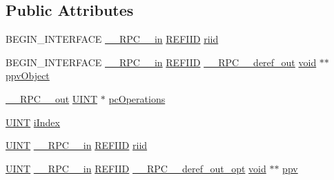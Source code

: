 \subsection*{Public Attributes}
\begin{DoxyCompactItemize}
\item 
B\+E\+G\+I\+N\+\_\+\+I\+N\+T\+E\+R\+F\+A\+CE \hyperlink{rpcsal_8h_a20b7f6da600a05c8b541659f14f7f0e6}{\+\_\+\+\_\+\+R\+P\+C\+\_\+\+\_\+in} \hyperlink{px__win__ds_8c_a80ec49c8ae61e234197d5071d2df497d}{R\+E\+F\+I\+ID} \hyperlink{struct_i_property_change_array_vtbl_afcb4782fa8fc212fa033864bbd143092}{riid}
\item 
B\+E\+G\+I\+N\+\_\+\+I\+N\+T\+E\+R\+F\+A\+CE \hyperlink{rpcsal_8h_a20b7f6da600a05c8b541659f14f7f0e6}{\+\_\+\+\_\+\+R\+P\+C\+\_\+\+\_\+in} \hyperlink{px__win__ds_8c_a80ec49c8ae61e234197d5071d2df497d}{R\+E\+F\+I\+ID} \hyperlink{rpcsal_8h_a23bc188526f10656f9c79d950f6c3192}{\+\_\+\+\_\+\+R\+P\+C\+\_\+\+\_\+deref\+\_\+out} \hyperlink{sound_8c_ae35f5844602719cf66324f4de2a658b3}{void} $\ast$$\ast$ \hyperlink{struct_i_property_change_array_vtbl_a1532e7faf97734c90901bc59cd67f1ba}{ppv\+Object}
\item 
\hyperlink{rpcsal_8h_aa518a2c78d44d75f3685c32c455c5ed8}{\+\_\+\+\_\+\+R\+P\+C\+\_\+\+\_\+out} \hyperlink{mapinls_8h_a36cb3b01d81ffd844bbbfb54003e06ec}{U\+I\+NT} $\ast$ \hyperlink{struct_i_property_change_array_vtbl_abbe22467b2210a2b8b747c8cc7dc6fed}{pc\+Operations}
\item 
\hyperlink{mapinls_8h_a36cb3b01d81ffd844bbbfb54003e06ec}{U\+I\+NT} \hyperlink{struct_i_property_change_array_vtbl_acfa70036730f768fc344b69b3cd64ad0}{i\+Index}
\item 
\hyperlink{mapinls_8h_a36cb3b01d81ffd844bbbfb54003e06ec}{U\+I\+NT} \hyperlink{rpcsal_8h_a20b7f6da600a05c8b541659f14f7f0e6}{\+\_\+\+\_\+\+R\+P\+C\+\_\+\+\_\+in} \hyperlink{px__win__ds_8c_a80ec49c8ae61e234197d5071d2df497d}{R\+E\+F\+I\+ID} \hyperlink{struct_i_property_change_array_vtbl_a62c9c1b7d42896500a8c050752e8c1a5}{riid}
\item 
\hyperlink{mapinls_8h_a36cb3b01d81ffd844bbbfb54003e06ec}{U\+I\+NT} \hyperlink{rpcsal_8h_a20b7f6da600a05c8b541659f14f7f0e6}{\+\_\+\+\_\+\+R\+P\+C\+\_\+\+\_\+in} \hyperlink{px__win__ds_8c_a80ec49c8ae61e234197d5071d2df497d}{R\+E\+F\+I\+ID} \hyperlink{rpcsal_8h_ab29e89ceb0eb0b075c6f6299b0de6a21}{\+\_\+\+\_\+\+R\+P\+C\+\_\+\+\_\+deref\+\_\+out\+\_\+opt} \hyperlink{sound_8c_ae35f5844602719cf66324f4de2a658b3}{void} $\ast$$\ast$ \hyperlink{struct_i_property_change_array_vtbl_a04e36a4df39a73f750c43f381ca896c3}{ppv}
\item 

\end{DoxyCompactItemize}
